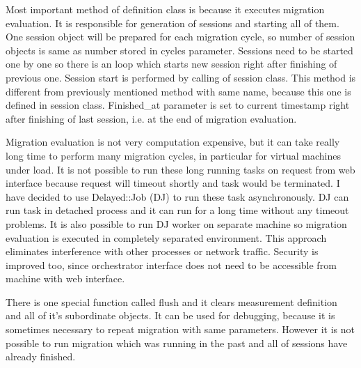 Most important method of definition class is  because it executes migration evaluation. It is responsible for generation of sessions and starting all of them. One session object will be prepared for each migration cycle, so number of session objects is same as number stored in cycles parameter. Sessions need to be started one by one so there is an loop which starts new session right after finishing of previous one. Session start is performed by calling  of session class. This method is different from previously mentioned method with same name, because this one is defined in session class.
Finished\_at parameter is set to current timestamp right after finishing of last session, i.e. at the end of migration evaluation. 

Migration evaluation is not very computation expensive, but it can take really long time to perform many migration cycles, in particular for virtual machines under load. It is not possible to run these long running tasks on request from web interface because request will timeout shortly and task would be terminated. I have decided to use Delayed::Job (\Ac{DJ}) to run these task asynchronously.
\Ac{DJ} can run task in detached process and it can run for a long time without any timeout problems. It is also possible to run \Ac{DJ} worker on separate machine so migration evaluation is executed in completely separated environment. This approach eliminates interference with other processes or network traffic. Security is improved too, since orchestrator interface does not need to be accessible from machine with web interface.

There is one special function called flush and it clears measurement definition and all of it's subordinate objects. It can be used for debugging, because it is sometimes necessary to repeat migration with same parameters. However it is not possible to run migration which was running in the past and all of sessions have already finished.


